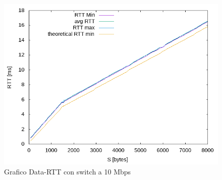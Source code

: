 \documentclass{exam}
\begin{document}
\begin{figure}[H]
	\centering
	\includegraphics[scale = 0.75]{Si_Switch/RTT-10Mbps.png}
	\caption{Grafico Data-RTT con switch a 10 Mbps}
	\label{fig:3.2RTT}
\end{figure}
\end{document}
